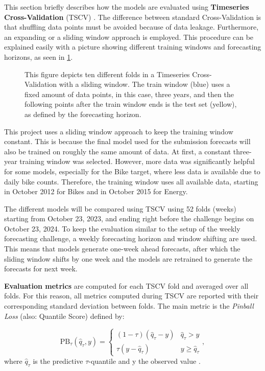 This section briefly describes how the models are evaluated using \textbf{Timeseries Cross-Validation} (TSCV) \parencite[Chapter~5.10]{hyndman_forecasting_2021}. The difference between standard Cross-Validation \parencite[241--248]{hastie_elements_2009} is that shuffling data points must be avoided because of data leakage. Furthermore, an expanding or a sliding window approach is employed. This procedure can be explained easily with a picture showing different training windows and forecasting horizons, as seen in \cref{fig:tscv}.
\begin{figure}[htbp]
    \centering
    
    \caption{This figure depicts ten different folds in a Timeseries Cross-Validation with a sliding window. The train window (blue) uses a fixed amount of data points, in this case, three years, and then the following points after the train window ends is the test set (yellow), as defined by the forecasting horizon.}
    \label{fig:tscv}
\end{figure}
This project uses a sliding window approach to keep the training window constant. This is because the final model used for the submission forecasts will also be trained on roughly the same amount of data. At first, a constant three-year training window was selected. However, more data was significantly helpful for some models, especially for the Bike target, where less data is available due to daily bike counts. Therefore, the training window uses all available data, starting in October 2012 for Bikes and in October 2015 for Energy.

The different models will be compared using TSCV using 52 folds (weeks) starting from October 23, 2023, and ending right before the challenge begins on October 23, 2024. To keep the evaluation similar to the setup of the weekly forecasting challenge, a weekly forecasting horizon and window shifting are used. This means that models generate one-week ahead forecasts, after which the sliding window shifts by one week and the models are retrained to generate the forecasts for next week.

\textbf{Evaluation metrics} are computed for each TSCV fold and averaged over all folds. For this reason, all metrics computed during TSCV are reported with their corresponding standard deviation between folds. The main metric is the \textit{Pinball Loss} (also: Quantile Score) defined by:

\begin{equation}
\label{eq:PinballLoss}
\text{PB}_{\tau}(\hat{q}_{\tau}, y) = 
\begin{cases} 
(1 - \tau) (\hat{q}_{\tau} - y) & \hat{q}_{\tau} > y \\
\tau (y - \hat{q}_{\tau}) & y \geq \hat{q}_{\tau}
\end{cases}
,
\end{equation}
where $\hat{q}_\tau$ is the predictive $\tau$-quantile and y the observed value \parencite[Chapter~5.9]{hyndman_forecasting_2021}.

